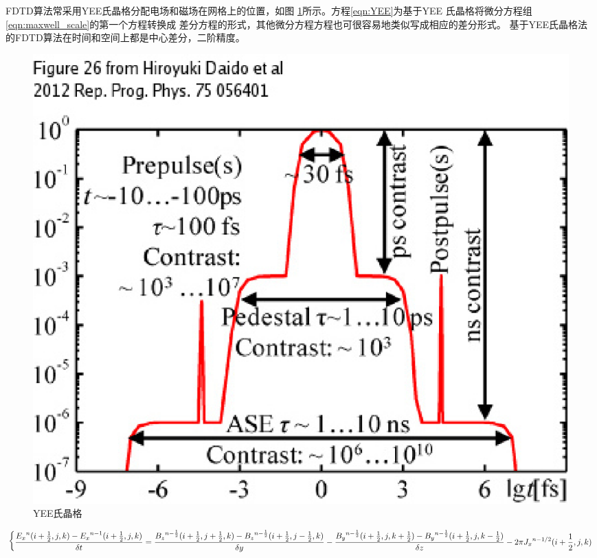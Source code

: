 FDTD算法常采用YEE氏晶格\cite{yee1966numerical}分配电场和磁场在网格上的位置，如图
\ref{fig:yee}所示。方程\ref{eqn:YEE}为基于YEE 氏晶格将微分方程组\ref{eqn:maxwell_scale}的第一个方程转换成
差分方程的形式，其他微分方程方程也可很容易地类似写成相应的差分形式。
基于YEE氏晶格法的FDTD算法在时间和空间上都是中心差分，二阶精度。
\begin{figure}[!htbp]
  \centering
  \includegraphics[width=\MyFactor\textwidth]{Img/prepulse2012.eps}
  \caption{YEE氏晶格}
  \label{fig:yee}
\end{figure}

\begin{equation}
\label{eqn:YEE}
\begin{dcases*}

\frac{{E_x}^{n}(i+\frac{1}{2},j,k)-{E_x}^{n-1}(i+\frac{1}{2},j,k) }{\delta t}=  \frac{{B_z}^{n-\frac{1}{2}}(i+\frac{1}{2},j+\frac{1}{2},k)-{B_z}^{n-\frac{1}{2}}(i+\frac{1}{2},j-\frac{1}{2},k) }{\delta y} -  \frac{{B_y}^{n-\frac{1}{2}}(i+\frac{1}{2},j,k+\frac{1}{2})-{B_y}^{n-\frac{1}{2}}(i+\frac{1}{2},j,k-\frac{1}{2}) }{\delta z}- 2 \pi {J_x}^{n-1/2}(i+\frac{1}{2},j,k)

\end{dcases*}
\end{equation} 




